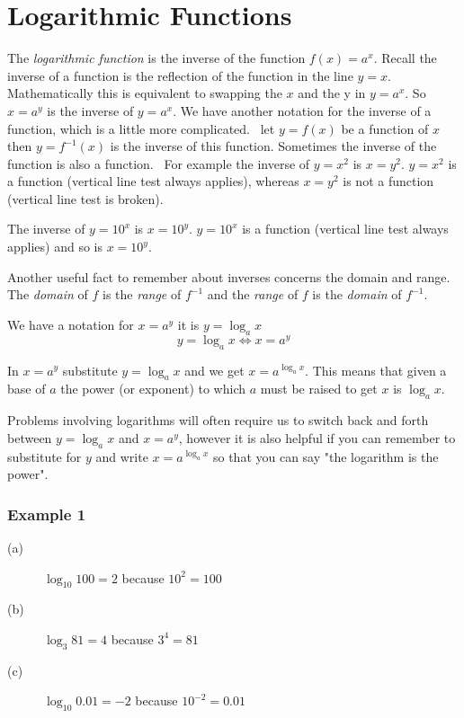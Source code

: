  

\section{Logarithmic Functions}
The \emph{logarithmic function} is the inverse of the function $f (x) =a^{x}$. Recall the inverse of a function is the reflection of the function in the line $y =x$. Mathematically this is equivalent to swapping the $x$ and the y in $y =a^{x}$. So $x =a^{y}$ is the inverse of $y =a^{x}$. We have another notation for the inverse of a function, which is a little more complicated.
\ let $y =f (x)$ be a function of $x$ then $y =f^{ -1} (x)$ is the inverse of this function. Sometimes the inverse of the function is also a function.
\ For example the inverse of $y =x^{2}$ is $x =y^{2}$. $y =x^{2}$ is a function (vertical line test always applies), whereas $x =y^{2}$ is not a function (vertical line test is broken). 

   
\setlength\fboxrule{0.01in}\setlength\fboxsep{0.2in}


The inverse of $y =10^{x}$ is $x =10^{y}$. $y =10^{x}$ is a function (vertical line test always applies) and so is $x =10^{y}$. 

   
\setlength\fboxrule{0.01in}\setlength\fboxsep{0.2in}


Another useful fact to remember about inverses concerns the domain and range. The \emph{domain}
of $f$ is the \emph{range} of $f^{ -1}$ and the \emph{range} of $f$ is the \emph{domain} of $f^{ -1}$. 

We have a notation for $x =a^{y}$ it is $y =\log _{a} x$
\begin{equation}y =\log _{a} x \Leftrightarrow x =a^{y}\tag{1}
\end{equation}

In $x =a^{y}$ substitute $y =\log _{a} x$ and we get $x =a^{\log _{a} x}$. This means that given a base of $a$ the power (or exponent) to which $a$ must be raised to get $x$ is $\log _{a} x$. 

Problems involving logarithms will often require us to switch back and forth between $y =\log _{a} x$ and $x =a^{y}$, however it is also helpful if you can remember to substitute for $y$ and write $x =a^{\log _{a} x}$ so that you can say "the logarithm is the power". 

\subsubsection{Example 1}
\begin{description}
\item [(a)] $\log _{10} 100 =2$ because $10^{2} =100$ 

\item [(b)] $\log _{3} 81 =4$ because $3^{4} =81$ 

\item [(c)] $\log _{10} 0.01 = -2$ because $10^{ -2} =0.01$ \end{description}

